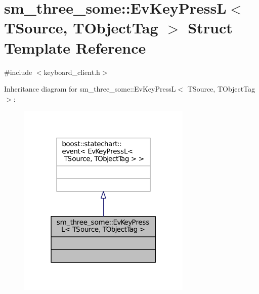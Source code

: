 \hypertarget{structsm__three__some_1_1EvKeyPressL}{}\section{sm\+\_\+three\+\_\+some\+:\+:Ev\+Key\+PressL$<$ T\+Source, T\+Object\+Tag $>$ Struct Template Reference}
\label{structsm__three__some_1_1EvKeyPressL}


{\ttfamily \#include $<$keyboard\+\_\+client.\+h$>$}



Inheritance diagram for sm\+\_\+three\+\_\+some\+:\+:Ev\+Key\+PressL$<$ T\+Source, T\+Object\+Tag $>$\+:
\nopagebreak
\begin{figure}[H]
\begin{center}
\leavevmode
\includegraphics[width=235pt]{structsm__three__some_1_1EvKeyPressL__inherit__graph}
\end{center}
\end{figure}


